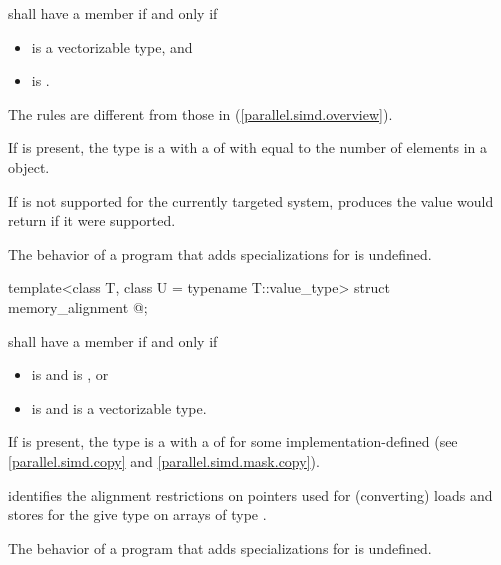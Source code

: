 \begin{itemdescr}
\pnum
{} shall have a member  if and only if
\begin{itemize}
  \item {} is a vectorizable type, and
  \item {} is .
\end{itemize}
\begin{note}
  The rules are different from those in (\ref{parallel.simd.overview}).
\end{note}

\pnum
If  is present, the type  is a  with a  of  with  equal to the number of elements in a  object. \begin{note}If  is not supported for the currently targeted system,  produces the value  would return if it were supported.\end{note}

\pnum
The behavior of a program that adds specializations for  is undefined.
\end{itemdescr}

\begin{itemdecl}
template<class T, class U = typename T::value_type> struct memory_alignment { @\seebelow@ };
\end{itemdecl}

\begin{itemdescr}
\pnum
{} shall have a member  if and only if
\begin{itemize}
  \item {} is  and  is , or
  \item {} is  and  is a vectorizable type.
\end{itemize}

\pnum
If  is present, the type  is a  with a  of  for some implementation-defined  (see \ref{parallel.simd.copy} and \ref{parallel.simd.mask.copy}). \begin{note} identifies the alignment restrictions on pointers used for (converting) loads and stores for the give type  on arrays of type .\end{note}

\pnum
The behavior of a program that adds specializations for  is undefined.
\end{itemdescr}

